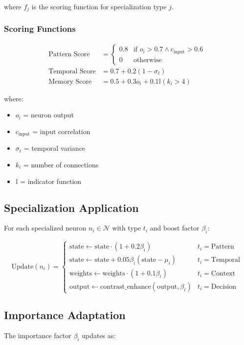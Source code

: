 \documentclass{article}
\begin{document}
where $f_j$ is the scoring function for specialization type $j$.

\subsubsection{Scoring Functions}
\begin{align}
\text{Pattern Score} &= \begin{cases}
0.8 & \text{if } o_i > 0.7 \land c_{\text{input}} > 0.6 \\
0 & \text{otherwise}
\end{cases} \\
\text{Temporal Score} &= 0.7 + 0.2(1 - \sigma_t) \\
\text{Memory Score} &= 0.5 + 0.3o_i + 0.1\mathbb{I}(k_i > 4)
\end{align}

where:
\begin{itemize}[leftmargin=*]
\item $o_i$ = neuron output
\item $c_{\text{input}}$ = input correlation
\item $\sigma_t$ = temporal variance
\item $k_i$ = number of connections
\item $\mathbb{I}$ = indicator function
\end{itemize}

\subsection{Specialization Application}
For each specialized neuron $n_i \in \mathcal{N}$ with type $t_i$ and boost factor $\beta_i$:

\begin{equation}
\text{Update}(n_i) =
\begin{cases}
\text{state} \leftarrow \text{state} \cdot (1 + 0.2\beta_i) & t_i = \text{Pattern} \\
\text{state} \leftarrow \text{state} + 0.05\beta_i(\text{state} - \mu_i) & t_i = \text{Temporal} \\
\text{weights} \leftarrow \text{weights} \cdot (1 + 0.1\beta_i) & t_i = \text{Context} \\
\text{output} \leftarrow \text{contrast\_enhance}(\text{output}, \beta_i) & t_i = \text{Decision}
\end{cases}
\end{equation}

\subsection{Importance Adaptation}
The importance factor $\beta_i$ updates as:
\end{document}

